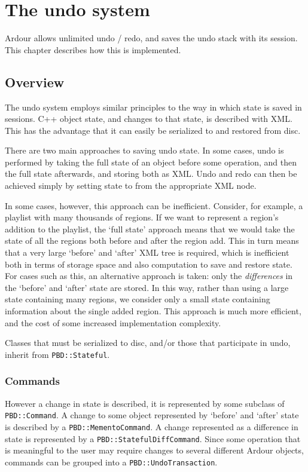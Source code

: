 \documentclass[10pt,a4paper]{book}
\newcommand{\code}[1]{\texttt{#1}}
\begin{document}
\chapter{The undo system}

Ardour allows unlimited undo / redo, and saves the undo stack with its
session.  This chapter describes how this is implemented.

\section{Overview}

The undo system employs similar principles to the way in which state
is saved in sessions.  C++ object state, and changes to that state, is
described with XML\@.  This has the advantage that it can easily be
serialized to and restored from disc.

There are two main approaches to saving undo state.  In some cases,
undo is performed by taking the full state of an object before some
operation, and then the full state afterwards, and storing both as
XML\@.  Undo and redo can then be achieved simply by setting state to
from the appropriate XML node.

In some cases, however, this approach can be inefficient.  Consider,
for example, a playlist with many thousands of regions.  If we want to
represent a region's addition to the playlist, the `full state'
approach means that we would take the state of all the regions both
before and after the region add.  This in turn means that a very large
`before' and `after' XML tree is required, which is inefficient both
in terms of storage space and also computation to save and restore
state.  For cases such as this, an alternative approach is taken: only
the \emph{differences} in the `before' and `after' state are stored.
In this way, rather than using a large state containing many regions,
we consider only a small state containing information about the single
added region.  This approach is much more efficient, and the cost of
some increased implementation complexity.

Classes that must be serialized to disc, and/or those that participate
in undo, inherit from \code{PBD::Stateful}.

\subsection{Commands}

However a change in state is described, it is represented by some
subclass of \code{PBD::Command}.  A change to some object represented
by `before' and `after' state is described by a
\code{PBD::MementoCommand}.  A change represented as a difference in
state is represented by a \code{PBD::StatefulDiffCommand}.  Since some
operation that is meaningful to the user may require changes to
several different Ardour objects, commands can be grouped into a
\code{PBD::UndoTransaction}.
\end{document}
